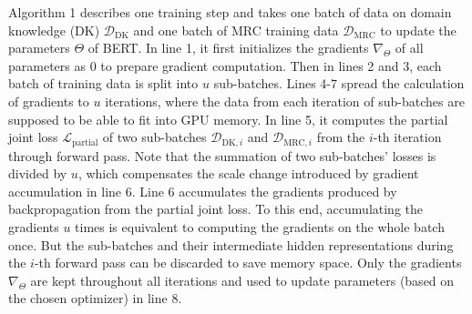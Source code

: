 
Algorithm 1 describes one training step and takes one batch of data on domain knowledge (DK) $\mathcal{D}_\text{DK}$ and one batch of MRC training data $\mathcal{D}_\text{MRC}$ to update the parameters $\Theta$ of BERT.
In line 1, it first initializes the gradients $\nabla_\Theta$ of all parameters as 0 to prepare gradient computation. Then in lines 2 and 3, each batch of training data is split into $u$ sub-batches. Lines 4-7 spread the calculation of gradients to $u$ iterations, where the data from each iteration of sub-batches are supposed to be able to fit into GPU memory.
In line 5, it computes the partial joint loss $\mathcal{L}_\text{partial}$ of two sub-batches $\mathcal{D}_{\text{DK}, i}$ and $\mathcal{D}_{\text{MRC}, i}$ from the $i$-th iteration through forward pass.
Note that the summation of two sub-batches' losses is divided by $u$, which compensates the scale change introduced by gradient accumulation in line 6.
Line 6 accumulates the gradients produced by backpropagation from the partial joint loss. To this end, accumulating the gradients $u$ times is equivalent to computing the gradients on the whole batch once. But the sub-batches and their intermediate hidden representations during the $i$-th forward pass can be discarded to save memory space.
Only the gradients $\nabla_\Theta$ are kept throughout all iterations and used to update parameters (based on the chosen optimizer) in line 8.

